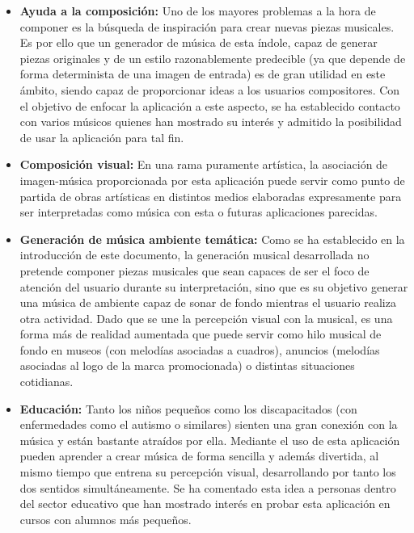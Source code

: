 \begin{itemize} 

\item\textbf{Ayuda a la composición:} Uno de los mayores problemas a la hora de componer es la búsqueda de inspiración para crear nuevas piezas musicales. Es por ello que un generador de música de esta índole, capaz de generar piezas originales y de un estilo razonablemente predecible (ya que depende de forma determinista de una imagen de entrada) es de gran utilidad en  este ámbito, siendo capaz de proporcionar ideas a los usuarios compositores. Con el objetivo de enfocar la aplicación a este aspecto, se ha establecido contacto con varios músicos quienes han mostrado su interés y admitido la posibilidad de usar la aplicación para tal fin.

\item\textbf{Composición visual:} En una rama puramente artística, la asociación de imagen-música proporcionada por esta aplicación puede servir como punto de partida de obras artísticas en distintos medios elaboradas expresamente para ser interpretadas como música con esta o futuras aplicaciones parecidas.

\item\textbf{Generación de música ambiente temática:} Como se ha establecido en la introducción de este documento, la generación musical desarrollada no pretende componer piezas musicales que sean capaces de ser el foco de atención del usuario durante su interpretación, sino que es su objetivo generar una música de ambiente capaz de sonar de fondo mientras el usuario realiza otra actividad. Dado que se une la percepción visual con la musical, es una forma más de realidad aumentada que puede servir como hilo musical de fondo en museos (con melodías asociadas a cuadros), anuncios (melodías asociadas al logo de la marca promocionada) o distintas situaciones cotidianas.

\item\textbf{Educación:} Tanto los niños pequeños como los discapacitados (con enfermedades como el autismo o similares) sienten una gran conexión con la música y están bastante atraídos por ella. Mediante el uso de esta aplicación pueden aprender a crear música de forma sencilla y además divertida, al mismo tiempo que entrena su percepción visual, desarrollando por tanto los dos sentidos simultáneamente. Se ha comentado esta idea a personas dentro del sector educativo que han mostrado interés en probar esta aplicación en cursos con alumnos más pequeños.

\end{itemize}

